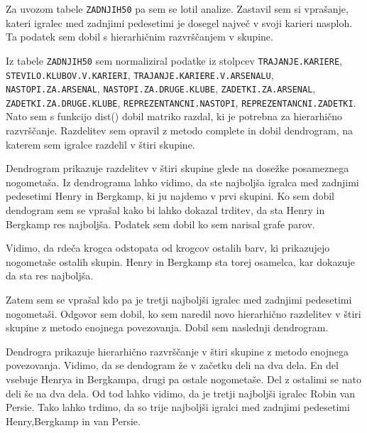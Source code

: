 \documentclass[11pt,a4paper]{article}
\begin{document}
Za uvozom tabele \verb|ZADNJIH50| pa sem se lotil analize. Zastavil sem si vprašanje, kateri igralec med zadnjimi pedesetimi je dosegel največ v svoji karieri nasploh. Ta podatek sem dobil s hierarhičnim razvrščanjem v skupine.

Iz tabele \verb|ZADNJIH50| sem normaliziral podatke iz stolpcev \texttt{TRAJANJE.KA\-RI\-E\-RE}, \verb|STEVILO.KLUBOV.V.KARIERI|, \verb|TRAJANJE.KARIERE.V.ARSENALU|, \texttt{NA\-STO\-PI.ZA.ARSENAL}, \verb|NASTOPI.ZA.DRUGE.KLUBE|, \verb|ZADETKI.ZA.ARSENAL|,  \texttt{ZA\-DE\-TKI.ZA.DRUGE.KLUBE}, \verb|REPREZENTANCNI.NASTOPI|, \texttt{REPREZENTANCNI.ZA\-DE\-TKI}. Nato sem s funkcijo dist() dobil matriko razdal, ki je potrebna za hierarhično razvrščanje. Razdelitev sem opravil z metodo complete in dobil dendrogram, na katerem sem igralce razdelil v štiri skupine.


Dendrogram  prikazuje razdelitev v štiri skupine glede na dosežke posameznega nogometaša.
Iz dendrograma lahko vidimo, da ste najboljša igralca med zadnjimi pedesetimi Henry in Bergkamp, ki ju najdemo v prvi skupini. 
\newpage
\indent Ko sem dobil dendogram sem se vprašal kako bi lahko dokazal trditev, da sta Henry in Bergkamp res najboljša. Podatek sem dobil ko sem narisal grafe parov.


Vidimo, da rdeča krogca odstopata od krogcov ostalih barv, ki prikazujejo nogometaše ostalih skupin. Henry in Bergkamp sta torej osamelca, kar dokazuje da sta res najboljša.
\newpage

Zatem sem se vprašal kdo pa je tretji najboljši igralec med zadnjimi pedesetimi nogometaši. Odgovor sem dobil, ko sem naredil novo hierarhično razdelitev v štiri skupine z metodo enojnega povezovanja. Dobil sem naslednji dendrogram.


Dendrogra prikazuje hierarhično razvrščanje v štiri skupine z metodo enojnega povezovanja. Vidimo, da se dendogram že v začetku deli na dva dela. En del vsebuje Henrya in Bergkampa, drugi pa ostale nogometaše. Del z ostalimi se nato deli še na dva dela. Od tod lahko vidimo, da je tretji najboljši igralec Robin van Persie. Tako lahko trdimo, da so trije najboljši igralci med zadnjimi pedesetimi Henry,Bergkamp in van Persie.
\end{document}

